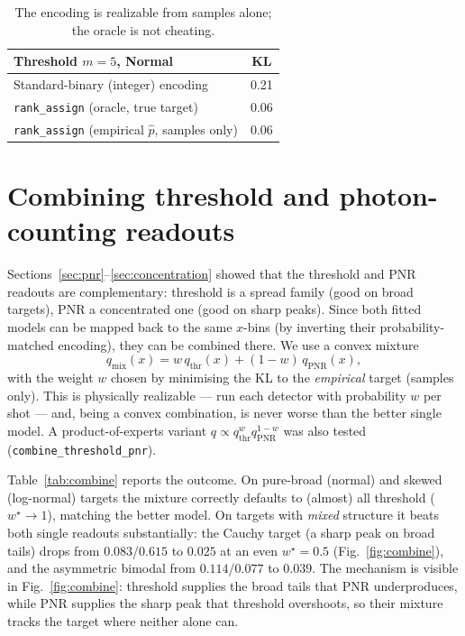 \documentclass[11pt,a4paper]{article}
\begin{document}
\begin{table}[h]
\centering
\begin{tabular}{lc}
\toprule
Threshold $m{=}5$, Normal & KL\\
\midrule
Standard-binary (integer) encoding & 0.21\\
\texttt{rank\_assign} (oracle, true target) & 0.06\\
\texttt{rank\_assign} (empirical $\hat p$, samples only) & 0.06\\
\bottomrule
\end{tabular}
\caption{The encoding is realizable from samples alone; the oracle is not
cheating.}
\label{tab:oracle}
\end{table}

\section{Combining threshold and photon-counting readouts}
\label{sec:combine}
Sections~\ref{sec:pnr}--\ref{sec:concentration} showed that the threshold and
PNR readouts are complementary: threshold is a spread family (good on broad
targets), PNR a concentrated one (good on sharp peaks). Since both fitted models
can be mapped back to the same $x$-bins (by inverting their probability-matched
encoding), they can be combined there. We use a convex mixture
\begin{equation}
q_{\mathrm{mix}}(x) = w\,q_{\mathrm{thr}}(x) + (1-w)\,q_{\mathrm{PNR}}(x),
\end{equation}
with the weight $w$ chosen by minimising the KL to the \emph{empirical} target
(samples only). This is physically realizable --- run each detector with
probability $w$ per shot --- and, being a convex combination, is never worse
than the better single model. A product-of-experts variant
$q\propto q_{\mathrm{thr}}^{w}q_{\mathrm{PNR}}^{1-w}$ was also tested
(\texttt{combine\_threshold\_pnr}).

Table~\ref{tab:combine} reports the outcome. On pure-broad (normal) and
skewed (log-normal) targets the mixture correctly defaults to (almost) all
threshold ($w^\star\!\to\!1$), matching the better model. On targets with
\emph{mixed} structure it beats both single readouts substantially: the Cauchy
target (a sharp peak on broad tails) drops from $0.083$/$0.615$ to $0.025$ at an
even $w^\star=0.5$ (Fig.~\ref{fig:combine}), and the asymmetric bimodal from
$0.114$/$0.077$ to $0.039$. The mechanism is visible in
Fig.~\ref{fig:combine}: threshold supplies the broad tails that PNR
underproduces, while PNR supplies the sharp peak that threshold overshoots, so
their mixture tracks the target where neither alone can.
\end{document}
